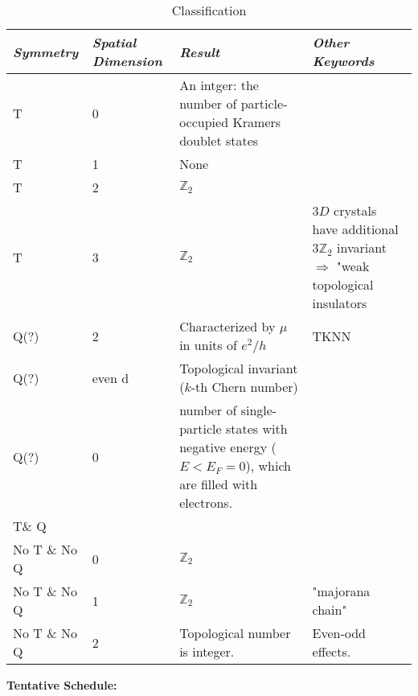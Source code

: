 \documentclass{article}
\begin{document}
\begin{table}[ht]
	\centering
	\caption{Classification}
	\label{tab:classification}
	\vspace{+0.5pt}
	\tabulinesep=1.2mm
	\begin{tabu}{  X[l] X[l] X[l] X[l] }
		\textit{Symmetry} & \textit{Spatial Dimension} &
		\textit{Result} & \textit{Other Keywords} \\
		\hline
		T & 0 & An intger: the number of particle-occupied Kramers
		doublet states & \\
		T & 1 & None & \\
		T & 2 & $\mathbb{Z}_2$ & \\
		T & 3 & $\mathbb{Z}_2$ & $3D$ crystals have additional
		$3\mathbb{Z}_2$ invariant$ \Rightarrow$ "weak topological
		insulators \\
		Q(?) & 2 & Characterized by $\mu$ in units of $e^2/h$ & TKNN \\
		Q(?) & even  d & Topological invariant ($k$-th Chern number) \\
		Q(?) & 0 &  number of single-particle states with negative
		energy ($E< E_F = 0$), which are filled with electrons. \\
		T\& Q \\
		No T \& No Q & 0 & $\mathbb{Z}_2$ \\
		No T \& No Q & 1 &$\mathbb{Z}_2$ &"majorana chain"  \\
		No T \& No Q & 2 & Topological number is integer. & Even-odd
		effects. \\
		\bottomrule
	\end{tabu}
\end{table}
\textbf{Tentative Schedule:}
\end{document}
